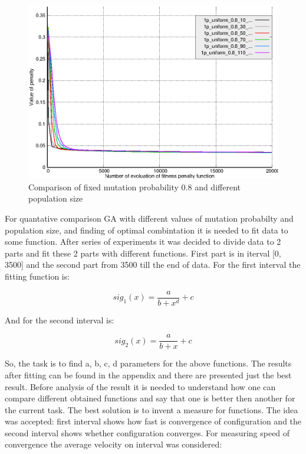 \documentclass[12pt]{report}
\begin{document}
\begin{figure}
    \centering
    \includegraphics[width=5.0in]{mppscomparison08}
    \caption{Comparison of fixed mutation probability 0.8 and different population size}
    \label{mppscomparison08}
\end{figure}

For quantative comparison GA with different values of mutation probabilty and population size, and finding of optimal combintation it is needed to fit data to some function. After series of experiments it was decided to divide data to 2 parts and fit these 2 parts with different functions. First part is in iterval [0, 3500] and the second part from 3500 till the end of data. For the first interval the fitting function is: 

\begin{equation} \label{sig1}
sig_1(x) = \frac{a}{b+x^d}+c
\end{equation}
\bigbreak

And for the second interval is:

\begin{equation} \label{sig2}
sig_2(x) = \frac{a}{b+x}+c
\end{equation}
\bigbreak

So, the task is to find a, b, c, d parameters for the above functions. The results after fitting  can be found in the appendix and there are  presented just the best result. Before analysis of the result it is needed to understand how one can compare different obtained functions and say that one is better then another for the current task. The best solution is to invent a measure for functions. The idea was accepted: first interval shows how fast is convergence of configuration and the second interval shows whether configuration converges. For measuring speed of convergence the average velocity on interval was considered:
\end{document}
